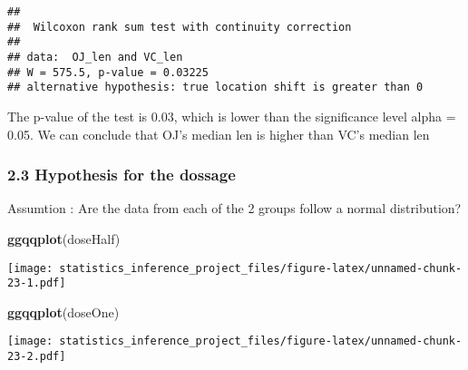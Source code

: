 \documentclass[]{article}
\newenvironment{Shaded}{\begin{snugshade}}{\end{snugshade}}
\newcommand{\KeywordTok}[1]{\textcolor[rgb]{0.13,0.29,0.53}{\textbf{#1}}}
\newcommand{\DecValTok}[1]{\textcolor[rgb]{0.00,0.00,0.81}{#1}}
\newcommand{\FloatTok}[1]{\textcolor[rgb]{0.00,0.00,0.81}{#1}}
\newcommand{\StringTok}[1]{\textcolor[rgb]{0.31,0.60,0.02}{#1}}
\newcommand{\OperatorTok}[1]{\textcolor[rgb]{0.81,0.36,0.00}{\textbf{#1}}}
\newcommand{\NormalTok}[1]{#1}
\begin{document}
\begin{verbatim}
## 
##  Wilcoxon rank sum test with continuity correction
## 
## data:  OJ_len and VC_len
## W = 575.5, p-value = 0.03225
## alternative hypothesis: true location shift is greater than 0
\end{verbatim}

The p-value of the test is 0.03, which is lower than the significance
level alpha = 0.05. We can conclude that OJ's median len is higher than
VC's median len

\subsubsection{2.3 Hypothesis for the
dossage}\label{hypothesis-for-the-dossage}

\begin{Shaded}
\end{Shaded}

Assumtion : Are the data from each of the 2 groups follow a normal
distribution?

\begin{Shaded}
\begin{Highlighting}[]
\KeywordTok{ggqqplot}\NormalTok{(doseHalf)}
\end{Highlighting}
\end{Shaded}

\texttt{[image: statistics\_inference\_project\_files/figure-latex/unnamed-chunk-23-1.pdf]}

\begin{Shaded}
\begin{Highlighting}[]
\KeywordTok{ggqqplot}\NormalTok{(doseOne)}
\end{Highlighting}
\end{Shaded}

\texttt{[image: statistics\_inference\_project\_files/figure-latex/unnamed-chunk-23-2.pdf]}
\end{document}
